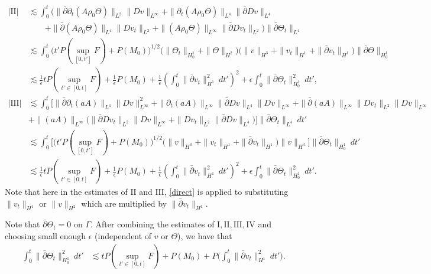 \documentclass[12pt,a4paper]{amsart}
\numberwithin{equation}{section}
\theoremstyle{plain}
\theoremstyle{definition}
\newcommand{\bpartial}{\bar{\partial}}
\begin{document}
\begin{align*}
|\mathrm{II}|
&\lesssim \int_{0}^{t} \Big( \|\bpartial\partial_t (A\rho_0 \Theta)\|_{L^2} \| Dv\|_{L^{\infty}}
    +\|\partial_t (A\rho_0 \Theta)\|_{L^4}  \|\bpartial Dv\|_{L^4}\\
   &\qquad
    +\|\bpartial (A\rho_0 \Theta)\|_{L^4} \| Dv_t\|_{L^2}
    +\| (A\rho_0 \Theta)\|_{L^{\infty}}  \|\bpartial Dv_t\|_{L^2}\Big)\|\bpartial \Theta_t\|_{L^4}\\
&\lesssim \int_{0}^{t}  \Big( t'P(\sup\limits_{[0,t']}F)+P(M_0)  \Big)^{1/2}\Big(\|\Theta_t\|_{H_0^1}+\|\Theta\|_{H^2}\Big)\Big(\|v\|_{H^3}+\|v_t\|_{H^1}+\|\bpartial v_t\|_{H^1}\Big) \|\bpartial \Theta \|_{H_0^1}\\
&\lesssim \frac{1}{\epsilon}tP(\sup\limits_{t'\in[0,t]}F)+\frac{1}{\epsilon}P(M_0)+\frac{1}{\epsilon}\left(\int_{0}^{t} \|\bpartial v_t\|_{H^1}^2\ dt'\right)^2+\epsilon \int_{0}^{t}\|\bpartial\Theta_{t}\|_{H_0^1}^2\ dt',\\
|\mathrm{III}|
&\lesssim \int_{0}^{t} \Big[ \|\bpartial\partial_t (aA)\|_{L^4}  \|Dv\|_{L^{\infty}}^2
            + \|\partial_t (aA)\|_{L^{\infty}}\|\bpartial Dv\|_{L^4} \|Dv\|_{L^{\infty}}
           +\|\bpartial (aA)\|_{L^{\infty}} \|Dv_t\|_{L^2} \|Dv\|_{L^{\infty}}\\
            &+ \| (aA)\|_{L^{\infty}} \Big(\|\bpartial Dv_t\|_{L^2} \|Dv\|_{L^{\infty}}+\|Dv_t\|_{L^2} \|\bpartial Dv\|_{L^4} \Big) \Big] \|\bpartial\Theta_{t}\|_{L^4} \ dt'\\
&\lesssim \int_{0}^{t} \Big[ \Big( t'P(\sup\limits_{[0,t']}F)+P(M_0)  \Big)^{1/2}
          \Big(\|v\|_{H^3}+ \|v_t\|_{H^1}+\|\bpartial v_t\|_{H^1}\Big) \|v\|_{H^3}
           \Big] \|\bpartial \Theta_{t}\|_{H_0^1} \ dt'\\
&\lesssim \frac{1}{\epsilon}tP(\sup\limits_{t'\in[0,t]}F)+\frac{1}{\epsilon}P(M_0)+\frac{1}{\epsilon}\left(\int_{0}^{t} \|\bpartial v_t\|_{H^1}^2\ dt'\right)^2+\epsilon \int_{0}^{t}\|\bpartial\Theta_{t}\|_{H_0^1}^2\ dt'.
\end{align*}
Note that here in the estimates of $\mathrm{II}$ and $\mathrm{III}$, \eqref{direct} is applied to substituting $\|v_t\|_{H^1}$ or $\|v\|_{H^2}$ which are multiplied by $\|\bpartial v_t\|_{H^1}$.


Note that $\bpartial\Theta_t=0$ on $\Gamma$.
After combining the estimates of $\mathrm{I}, \mathrm{II}, \mathrm{III}, \mathrm{IV}$ 
and choosing small enough $\epsilon$ (independent of $v$ or $\Theta$), 
we have that
\begin{equation}\label{thetatx}
\begin{aligned}
\int_{0}^{t}\|\bpartial \Theta_t\|_{H_0^1}^2\ dt'
&\lesssim tP(\sup\limits_{t'\in[0,t]}F)+P(M_0)+P \Big(\int_{0}^{t} \|\bpartial v_t\|_{H^1}^2 \ dt'\Big).
\end{aligned}
\end{equation}
\end{document}
